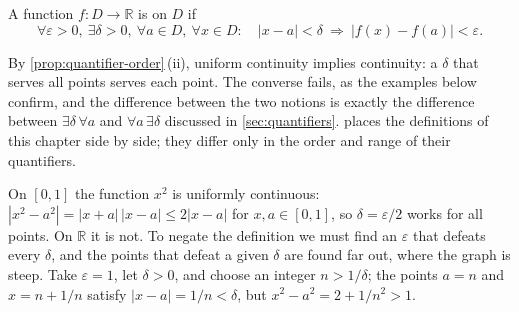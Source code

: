 \begin{definition}
\label{def:uniform-continuity}
A function $f\colon D\to\mathbb R$ is  on $D$ if
\[
\forall\varepsilon>0,\ \exists\delta>0,\ \forall a\in D,\ \forall x\in D:\quad|x-a|<\delta\ \Rightarrow\ |f(x)-f(a)|<\varepsilon .
\]
\end{definition}

By \cref{prop:quantifier-order}\,(ii), uniform continuity implies continuity: a $\delta$ that serves all points serves each point. The converse fails, as the examples below confirm, and the difference between the two notions is exactly the difference between $\exists\delta\,\forall a$ and $\forall a\,\exists\delta$ discussed in \cref{sec:quantifiers}.  places the definitions of this chapter side by side; they differ only in the order and range of their quantifiers.

\begin{table}
\end{table}

On $[0,1]$ the function $x^2$ is uniformly continuous: $|x^2-a^2|=|x+a|\,|x-a|\le2|x-a|$ for $x,a\in[0,1]$, so $\delta=\varepsilon/2$ works for all points. On $\mathbb R$ it is not. To negate the definition we must find an $\varepsilon$ that defeats every $\delta$, and the points that defeat a given $\delta$ are found far out, where the graph is steep. Take $\varepsilon=1$, let $\delta>0$, and choose an integer $n>1/\delta$; the points $a=n$ and $x=n+1/n$ satisfy $|x-a|=1/n<\delta$, but $x^2-a^2=2+1/n^2>1$.

